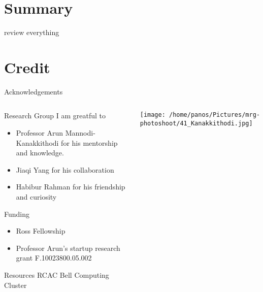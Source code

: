\documentclass[10pt, aspectratio=169, presentation]{beamer}
\begin{document}
\section{Summary}
\label{sec:org69935b8}
\begin{frame}[label={sec:org4e5e961}]{review everything}
\end{frame}
\section{Credit}
\label{sec:org8af9a23}
\begin{frame}[label={sec:orgc2cf4d0}]{Acknowledgements}
\begin{columns}
\begin{column}{0.6\columnwidth}
\begin{block}{Research Group}
I am greatful to
\begin{itemize}
\item Professor Arun Mannodi-Kanakkithodi for his mentorship and knowledge.
\item Jiaqi Yang for his collaboration
\item Habibur Rahman for his friendship and curiosity
\end{itemize}
\end{block}
\begin{block}{Funding}
\begin{itemize}
\item Ross Fellowship
\item Professor Arun's startup research grant F.10023800.05.002
\end{itemize}
\end{block}
\begin{block}{Resources}
RCAC Bell Computing Cluster
\end{block}
\end{column}
\begin{column}{0.4\columnwidth}
\hspace*{-1cm}
\texttt{[image: /home/panos/Pictures/mrg-photoshoot/41\_Kanakkithodi.jpg]}
\end{column}
\end{columns}
\end{frame}
\end{document}
